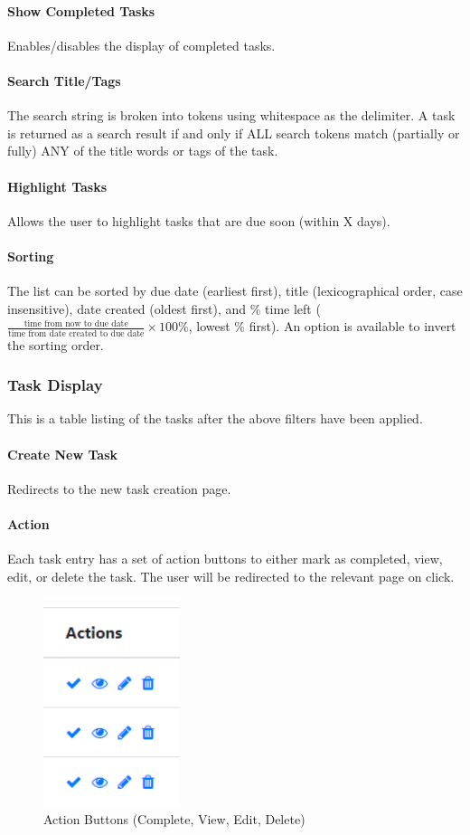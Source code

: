 \documentclass[12pt]{article}
\begin{document}
    	\paragraph{Show Completed Tasks}
    	Enables/disables the display of completed tasks.
	   	\paragraph{Search Title/Tags}
	   	The search string is broken into tokens using whitespace as the delimiter.
	   	A task is returned as a search result if and only if ALL search tokens match (partially or fully) ANY of the title words or tags of the task.
	   	\paragraph{Highlight Tasks}
	   	Allows the user to highlight tasks that are due soon (within X days).	   	
	   	\paragraph{Sorting}
	   	The list can be sorted by due date (earliest first), title (lexicographical order, case insensitive), date created (oldest first), and \% time left ($\frac{\text{time from now to due date}}{\text{time from date created to due date}} \times 100\%$, lowest \% first). An option is available to invert the sorting order.
  	
  	  \subsubsection{Task Display}
  	    This is a table listing of the tasks after the above filters have been applied.
  	    \paragraph{Create New Task}
  	    Redirects to the new task creation page.
	  	\paragraph{Action}
	  	Each task entry has a set of action buttons to either mark as completed, view, edit, or delete the task. The user will be redirected to the relevant page on click.
    	\begin{figure}[h]
		  \includegraphics[width=4cm]{action.png}
		  \centering
		  \caption{Action Buttons (Complete, View, Edit, Delete)}
		\end{figure}
\end{document}
